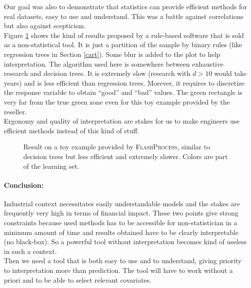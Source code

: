 \documentclass[12pt,a4paper]{report}
\begin{document}
			Our goal was also to demonstrate that statistics can provide efficient methods for real datasets, easy to use and understand.	This was a battle against correlations but also against scepticism. \\
			
			Figure \ref{Regle2D} shows the kind of results proposed by a rule-based software that is sold as a non-statistical tool. It is just a partition of the sample by binary rules (like regression trees in Section \ref{cart}). Some blur is added to the plot to help interpretation. The algorithm used here is somewhere between exhaustive research and decision trees. It is extremely slow (research with $d>10$ would take years) and is less efficient than regression trees. Morever, it requires to discretize the response variable to obtain ``good'' and ``bad'' values. The green rectangle is very far from the true green zone even for this toy example provided by the reseller.\\
			
			Ergonomy and quality of interpretation are stakes for us to make engineers use efficient methods instead of this kind of stuff.
	
		\begin{figure}[h!]
	\caption{Result on a toy example provided by \textsc{FlashProcess}, similar to decision trees but less efficient and extremely slower. Colors are part of the learning set.}\label{Regle2D}
\end{figure}	


\paragraph{Conclusion:} Industrial context necessitates easily understandable models and the stakes are frequently very high in terms of financial impact. 
		These two points give strong constraints because used methods has to be accessible for non-statistician in a minimum amount of time and results obtained have to be clearly interpretable (no black-box). So a powerful tool without interpretation becomes kind of useless in such a context.\\
 Then we need a tool that is both easy to use and to understand, giving priority to interpretation more than prediction. The tool will have to work without a priori and to be able to select relevant covariates. \\
\end{document}
